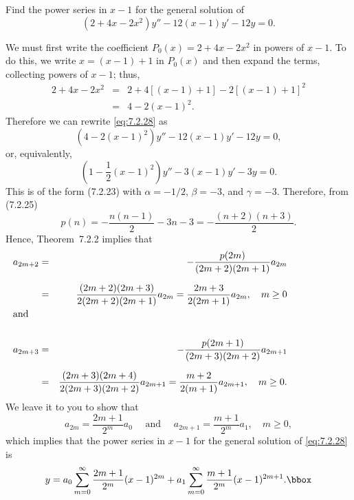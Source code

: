 \setcounter{example}{2}
\setcounter{equation}{27}
\begin{example}
  \label{example:7.2.3}\rm Find the power series in $x-1$ for the general solution of
  \begin{equation}
    \label{eq:7.2.28}(2+4x-2x^{2})y''-12(x-1)y'-12y=0.
  \end{equation}
\end{example}
\begin{examplesolution}
\solution We must first write the coefficient $P_{0}(x)=2+4x-2x^{2}$ in powers of $x-1$. To do this,
we write $x=(x-1)+1$ in $P_{0}(x)$ and then expand the terms, collecting powers of $x-1$; thus,
\begin{eqnarray*}
  2+4x-2x^{2} & = & 2+4[(x-1)+1]-2[(x-1)+1]^{2} \\
              & = & 4-2(x-1)^{2}.
\end{eqnarray*}
Therefore we can rewrite \eqref{eq:7.2.28} as
\[
  \left(4-2(x-1)^{2}\right)y''-12(x-1)y'-12y=0,
\]
or, equivalently,
\[
  \left(1-\frac{1}{2}(x-1)^{2}\right)y''-3(x-1)y'-3y=0.
\]
This is of the form \textup{(7.2.23)} with $\alpha=-1/2$, $\beta=-3$, and $\gamma=-3$. Therefore,
from \textup{(7.2.25)}
\[
  p(n)=-\frac{n(n-1)}{2}-3n-3=-\frac{(n+2)(n+3)}{2}.
\]
Hence, Theorem~7.2.2 implies that
\begin{eqnarray*}
  a_{2m+2}                            & = & -\frac{p(2m)}{(2m+2)(2m+1)}a_{2m}                                               \\[2\jot]
                                      & = & \frac{(2m+2)(2m+3)}{2(2m+2)(2m+1)}a_{2m}=\frac{2m+3}{2(2m+1)}a_{2m},\quad m\ge0 \\
  \noalign{\hspace*{-15pt}\mbox{and}}                                                                                       \\
  a_{2m+3}                            & = & -\frac{p(2m+1)}{(2m+3)(2m+2)}a_{2m+1}                                           \\[2\jot]
                                      & = & \frac{(2m+3)(2m+4)}{2(2m+3)(2m+2)}a_{2m+1}=\frac{m+2}{2(m+1)}a_{2m+1},\quad m\ge0.
\end{eqnarray*}
We leave it to you to show that
\[
  a_{2m}=\frac{2m+1}{2^{m}}a_{0}\quad\mbox{ and }\quad a_{2m+1}=\frac{m+1}{2^{m}}a_{1},\quad m\ge0,
\]
which implies that the power series in $x-1$ for the general solution of \eqref{eq:7.2.28} is
\[
  y=a_{0}\sum_{m=0}^{\infty}\frac{2m+1}{2^{m}}(x-1)^{2m}+a_{1}\sum_{m=0}^{\infty}\frac{m+1}{2^{m}}(x-1)^{2m+1}.\bbox
\]
\end{examplesolution}

